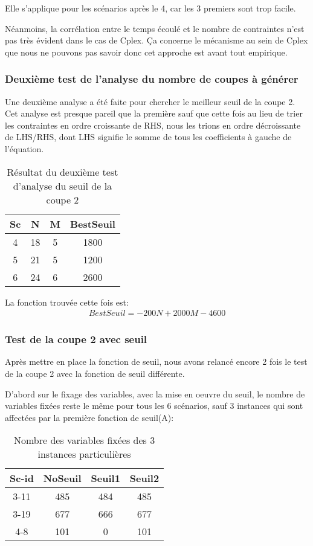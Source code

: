 \documentclass[twoside,fleqn]{EPURapport}
\begin{document}
Elle s'applique pour les scénarios après le 4, car les 3 premiers sont trop facile.

Néanmoins, la corrélation entre le temps écoulé et le nombre de contraintes n'est pas très évident dans le cas de Cplex. Ça concerne le mécanisme au sein de Cplex que nous ne pouvons pas savoir donc cet approche est avant tout empirique.

\subsubsection{Deuxième test de l'analyse du nombre de coupes à générer}
Une deuxième analyse a été faite pour chercher le meilleur seuil de la coupe 2. Cet analyse est presque pareil que la première sauf que cette fois au lieu de trier les contraintes en ordre croissante de RHS, nous les trions en ordre décroissante de LHS/RHS, dont LHS signifie le somme de tous les coefficients à gauche de l'équation.

\begin{table}[h]
    \centering
    \begin{tabular}{|c|c|c|c|}
    	\hline
Sc& 	N	& M	& BestSeuil\\ \hline
4 & 	18	& 5	& 1800      \\ \hline
5 & 	21	& 5	& 1200      \\ \hline
6 & 	24	& 6	& 2600     \\ \hline
    \end{tabular}
    \caption{Résultat du deuxième test d'analyse du seuil de la coupe 2}
    \label{tab_pre_2_seuil2}
\end{table}
\bigskip

La fonction trouvée cette fois est:
\begin{align}
BestSeuil=-200N + 2000M-4600 %
\end{align}

\subsubsection{Test de la coupe 2 avec seuil }
Après mettre en place la fonction de seuil, nous avons relancé encore 2 fois le test de la coupe 2 avec la fonction de seuil différente.

D'abord sur le fixage des variables, avec la mise en oeuvre du seuil, le nombre de variables fixées reste le même pour tous les 6 scénarios, sauf 3 instances qui sont affectées par la première fonction de seuil(A):
\begin{table}[h]
    \centering
    \begin{tabular}{|c|c|c|c|}
    	\hline
Sc-id& 	NoSeuil	& Seuil1	& Seuil2\\ \hline
3-11 & 	485	& 484	& 485      \\ \hline
3-19 & 	677	& 666	& 677      \\ \hline
4-8 & 	101	& 0	& 101     		\\ \hline
    \end{tabular}
    \caption{Nombre des variables fixées des 3 instances particulières}
    \label{tab_cut2_seuil_fix_cmp}
\end{table}
\bigskip
\end{document}
